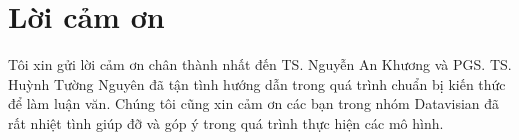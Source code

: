 \chapter*{Lời cảm ơn}
Tôi xin gửi lời cảm ơn chân thành nhất đến TS. Nguyễn An Khương và PGS. TS. Huỳnh Tường Nguyên đã tận tình hướng dẫn trong quá trình chuẩn bị kiến thức để làm luận văn. Chúng tôi cũng xin cảm ơn các bạn trong nhóm Datavisian đã rất nhiệt tình giúp đỡ và góp ý trong quá trình thực hiện các mô hình.
